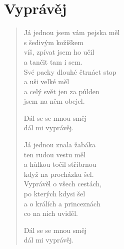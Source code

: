 \section*{Vyprávěj}

\begin{verse}
Já jednou jsem vám pejska měl \\
s šedivým kožíškem \\
víš, zpívat jsem ho učil \\
a tančit tam i sem.\\
Své packy dlouhé čtrnáct stop\\
a uši velké měl\\
a celý svět jen za půlden\\
jsem na něm obejel.

Dál se se mnou směj\\
dál mi vyprávěj.

Já jednou znala žabáka\\
ten rudou vestu měl\\
a hůlkou točil stříbrnou\\
když na procházku šel.\\
Vyprávěl o všech cestách,\\
po kterých kdysi šel\\
a o králích a princeznách\\
co na nich uviděl.

Dál se se mnou směj\\
dál mi vyprávěj.




\end{verse}
